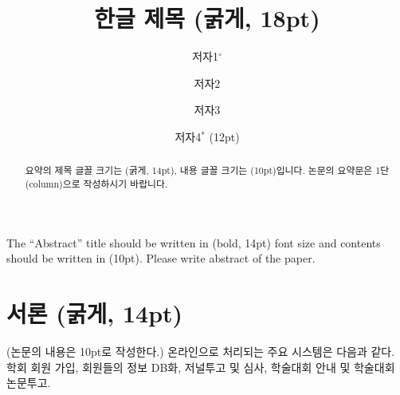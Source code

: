 \documentclass[a4paper,twocolumn]{article}
\begin{document}
\title{한글 제목 (굵게, 18pt)}

\author{저자1$^{\circ}$
\and 저자2
\and 저자3
\and 저자4$^{*}$ (12pt)}







\begin{abstract}

요약의 제목 글꼴 크기는 (굵게, 14pt), 내용 글꼴 크기는 (10pt)입니다. 논문의 요약문은 1단 (column)으로 작성하시기 바랍니다.

\end{abstract}

\begin{enabstract}

The ``Abstract'' title should be written in (bold, 14pt) font size and contents should be written in (10pt).
Please write abstract of the paper.

\end{enabstract}


\maketitle


\section{서론 (굵게, 14pt)}
\label{sec:introduction}
(논문의 내용은 10pt로 작성한다.)
온라인으로 처리되는 주요 시스템은 다음과 같다.
학회 회원 가입, 회원들의 정보 DB화, 저널투고 및 심사, 
학술대회 안내 및 학술대회 논문투고.
\end{document}
